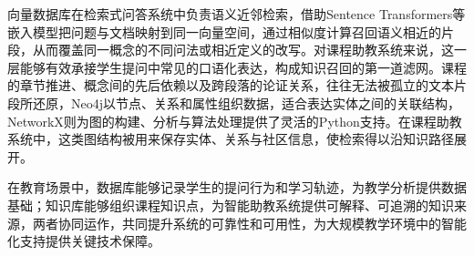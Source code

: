 向量数据库在检索式问答系统中负责语义近邻检索，借助Sentence Transformers等嵌入模型把问题与文档映射到同一向量空间，通过相似度计算召回语义相近的片段，从而覆盖同一概念的不同问法或相近定义的改写。对课程助教系统来说，这一层能够有效承接学生提问中常见的口语化表达，构成知识召回的第一道滤网。课程的章节推进、概念间的先后依赖以及跨段落的论证关系，往往无法被孤立的文本片段所还原，Neo4j以节点、关系和属性组织数据，适合表达实体之间的关联结构，NetworkX则为图的构建、分析与算法处理提供了灵活的Python支持。在课程助教系统中，这类图结构被用来保存实体、关系与社区信息，使检索得以沿知识路径展开。

在教育场景中，数据库能够记录学生的提问行为和学习轨迹，为教学分析提供数据基础；知识库能够组织课程知识点，为智能助教系统提供可解释、可追溯的知识来源，两者协同运作，共同提升系统的可靠性和可用性，为大规模教学环境中的智能化支持提供关键技术保障。

